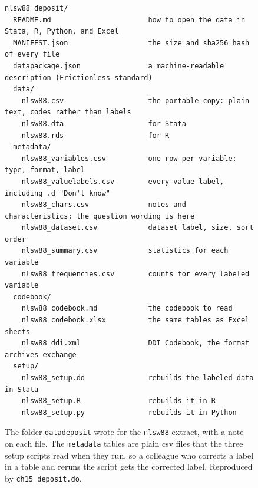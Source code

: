 \begin{figure}[htbp]
\centering
{\footnotesize
\begin{mdframed}[backgroundcolor=aeBg,linecolor=aeRule,linewidth=0.6pt,%
roundcorner=3pt,innertopmargin=5pt,innerbottommargin=5pt,%
innerleftmargin=8pt,innerrightmargin=8pt]
\begin{verbatim}
nlsw88_deposit/
  README.md                       how to open the data in Stata, R, Python, and Excel
  MANIFEST.json                   the size and sha256 hash of every file
  datapackage.json                a machine-readable description (Frictionless standard)
  data/
    nlsw88.csv                    the portable copy: plain text, codes rather than labels
    nlsw88.dta                    for Stata
    nlsw88.rds                    for R
  metadata/
    nlsw88_variables.csv          one row per variable: type, format, label
    nlsw88_valuelabels.csv        every value label, including .d "Don't know"
    nlsw88_chars.csv              notes and characteristics: the question wording is here
    nlsw88_dataset.csv            dataset label, size, sort order
    nlsw88_summary.csv            statistics for each variable
    nlsw88_frequencies.csv        counts for every labeled variable
  codebook/
    nlsw88_codebook.md            the codebook to read
    nlsw88_codebook.xlsx          the same tables as Excel sheets
    nlsw88_ddi.xml                DDI Codebook, the format archives exchange
  setup/
    nlsw88_setup.do               rebuilds the labeled data in Stata
    nlsw88_setup.R                rebuilds it in R
    nlsw88_setup.py               rebuilds it in Python
\end{verbatim}
\end{mdframed}
}
\caption[What a data deposit contains]{The folder \texttt{datadeposit} wrote for the \texttt{nlsw88} extract, with a note on each file. The \texttt{metadata} tables are plain csv files that the three setup scripts read when they run, so a colleague who corrects a label in a table and reruns the script gets the corrected label. Reproduced by \texttt{ch15\_deposit.do}.}
\label{fig:ch15-deposit-folder}
\end{figure}


